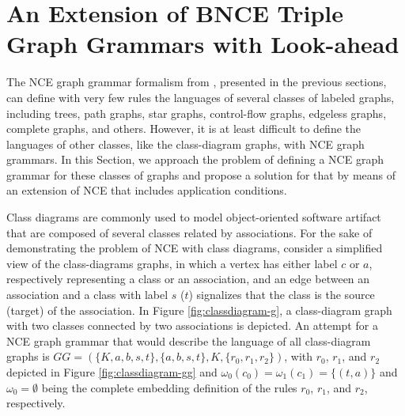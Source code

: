 \documentclass[]{report}
\begin{document}


\section{An Extension of BNCE Triple Graph Grammars with Look-ahead}
The NCE graph grammar formalism from \cite{janssens1982graph}, presented in the previous sections, can define with very few rules the languages of several classes of labeled graphs, including trees, path graphs, star graphs, control-flow graphs, edgeless graphs, complete graphs, and others. However, it is at least difficult to define the languages of other classes, like the class-diagram graphs, with NCE graph grammars. In this Section, we approach the problem of defining a NCE graph grammar for these classes of graphs and propose a solution for that by means of an extension of NCE that includes application conditions.

Class diagrams are commonly used to model object-oriented software artifact that are composed of several classes related by associations. For the sake of demonstrating the problem of NCE with class diagrams, consider a simplified view of the class-diagrams graphs, in which a vertex has either label $c$ or $a$, respectively representing a class or an association, and an edge between an association and a class with label $s$ ($t$) signalizes that the class is the source (target) of the association. In Figure \ref{fig:classdiagram-g}, a class-diagram graph with two classes connected by two associations is depicted. An attempt for a NCE graph grammar that would describe the language of all class-diagram graphs is $GG = (\{K,a,b,s,t\}, \{a,b,s,t\}, K, \{r_0, r_1, r_2\})$, with $r_0$, $r_1$, and $r_2$ depicted in Figure \ref{fig:classdiagram-gg} and $\omega_0(c_0) = \omega_1(c_1) = \{(t,a)\}$ and $\omega_0 = \emptyset$ being the complete embedding definition of the rules $r_0$, $r_1$, and $r_2$, respectively.
\end{document}
